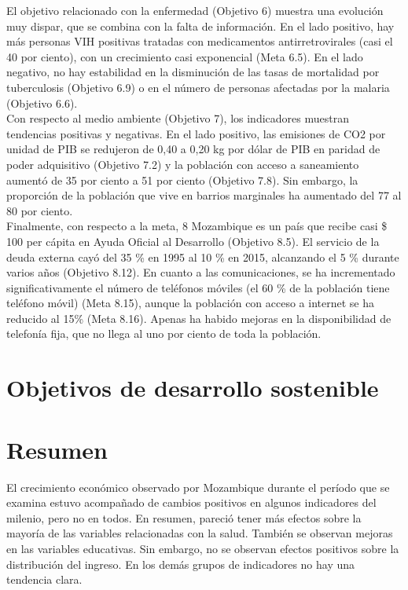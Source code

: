 El objetivo relacionado con la enfermedad (Objetivo 6) muestra una evolución muy dispar, que se combina con la falta de información. En el lado positivo, hay más personas VIH positivas tratadas con medicamentos antirretrovirales (casi el 40 por ciento), con un crecimiento casi exponencial (Meta 6.5). En el lado negativo, no hay estabilidad en la disminución de las tasas de mortalidad por tuberculosis (Objetivo 6.9) o en el número de personas afectadas por la malaria (Objetivo 6.6).\\
Con respecto al medio ambiente (Objetivo 7), los indicadores muestran tendencias positivas y negativas. En el lado positivo, las emisiones de CO2 por unidad de PIB se redujeron de 0,40 a 0,20 kg por dólar de PIB en paridad de poder adquisitivo (Objetivo 7.2) y la población con acceso a saneamiento aumentó de 35 por ciento a 51 por ciento (Objetivo 7.8). Sin embargo, la proporción de la población que vive en barrios marginales ha aumentado del 77 al 80 por ciento.\\
Finalmente, con respecto a la meta, 8 Mozambique es un país que recibe casi \$ 100 per cápita en Ayuda Oficial al Desarrollo (Objetivo 8.5). El servicio de la deuda externa cayó del 35 \% en 1995 al 10 \% en 2015, alcanzando el 5 \% durante varios años (Objetivo 8.12). En cuanto a las comunicaciones, se ha incrementado significativamente el número de teléfonos móviles (el 60 \% de la población tiene teléfono móvil) (Meta 8.15), aunque la población con acceso a internet se ha reducido al 15\% (Meta 8.16). Apenas ha habido mejoras en la disponibilidad de telefonía fija, que no llega al uno por ciento de toda la población.\\

\section{Objetivos de desarrollo sostenible}

\section{Resumen}
El crecimiento económico observado por Mozambique durante el período que se examina estuvo acompañado de cambios positivos en algunos indicadores del milenio, pero no en todos. En resumen, pareció tener más efectos sobre la mayoría de las variables relacionadas con la salud. También se observan mejoras en las variables educativas. Sin embargo, no se observan efectos positivos sobre la distribución del ingreso. En los demás grupos de indicadores no hay una tendencia clara.





